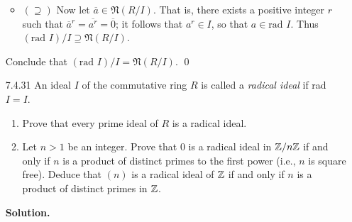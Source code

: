 \begin{enumerate}
\begin{itemize}
         \item $(\supseteq)$ Now let $\overline{a} \in \mathfrak{N}(R/I)$. That 
               is, there exists a positive integer $r$ such that
               $\overline{a}^r = \overline{a^r} = \overline{0}$; it follows that
               $a^r \in I$, so that $a \in \text{rad }I$. Thus
                $(\text{rad } I)/I \supseteq \mathfrak{N}(R/I)$.
      \end{itemize}
      Conclude that  $(\text{rad } I)/I = \mathfrak{N}(R/I)$. \qed
   \item[7.4.31]  An ideal $I$ of the commutative ring $R$ is called a
                  \textit{radical ideal} if rad $I = I$.
                  \begin{enumerate}
                     \item Prove that every prime ideal of $R$ is a radical
                           ideal.
                     \item Let $n > 1$ be an integer. Prove that 0 is a radical
                           ideal in $\mathbb{Z}/n\mathbb{Z}$ if and only if $n$ is a product of
                           distinct primes to the first power (i.e., $n$ is
                           square free). Deduce that $(n)$ is a radical ideal of
                           $\mathbb{Z}$ if and only if $n$ is a product of distinct
                           primes in $\mathbb{Z}$.
                  \end{enumerate}

      \textbf{Solution.}


\end{enumerate}
